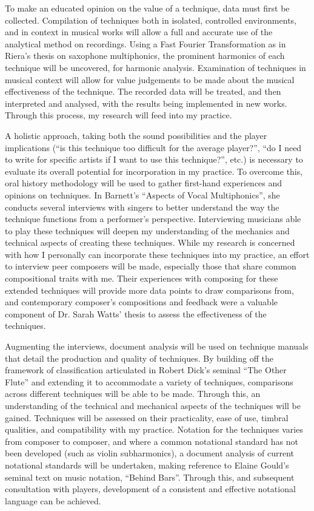 To make an educated opinion on the value of a technique, data must first be collected. Compilation of techniques both in isolated, controlled environments, and in context in musical works will allow a full and accurate use of the analytical method on recordings. Using a Fast Fourier Transformation as in Riera’s thesis on saxophone multiphonics, the prominent harmonics of each technique will be uncovered, for harmonic analysis.\autocite{rieraComparativeStudySaxophone2014} Examination of techniques in musical context will allow for value judgements to be made about the musical effectiveness of the technique. The recorded data will be treated, and then interpreted and analysed, with the results being implemented in new works.\autocite{torresMultiphonicsCompositionalElement2012} Through this process, my research will feed into my practice.

A holistic approach, taking both the sound possibilities and the player implications (“is this technique too difficult for the average player?”, “do I need to write for specific artists if I want to use this technique?”, etc.) is necessary to evaluate its overall potential for incorporation in my practice. To overcome this, oral history methodology will be used to gather first-hand experiences and opinions on techniques. In Barnett’s “Aspects of Vocal Multiphonics”, she conducts several interviews with singers to better understand the way the technique functions from a performer’s perspective.\autocite{barnettAspectsVocalMultiphonics1977} Interviewing musicians able to play these techniques will deepen my understanding of the mechanics and technical aspects of creating these techniques. While my research is concerned with how I personally can incorporate these techniques into my practice, an effort to interview peer composers will be made, especially those that share common compositional traits with me. Their experiences with composing for these extended techniques will provide more data points to draw comparisons from, and contemporary composer’s compositions and feedback were a valuable component of Dr. Sarah Watts’ thesis to assess the effectiveness of the techniques.

Augmenting the interviews, document analysis will be used on technique manuals that detail the production and quality of techniques. By building off the framework of classification articulated in Robert Dick’s seminal “The Other Flute” and extending it to accommodate a variety of techniques, comparisons across different techniques will be able to be made.\autocite{dickOtherFlute1989}  Through this, an understanding of the technical and mechanical aspects of the techniques will be gained. Techniques will be assessed on their practicality, ease of use, timbral qualities, and compatibility with my practice. Notation for the techniques varies from composer to composer, and where a common notational standard has not been developed (such as violin subharmonics), a document analysis of current notational standards will be undertaken, making reference to Elaine Gould’s seminal text on music notation, “Behind Bars”.\autocite{gouldBars2011} Through this, and subsequent consultation with players, development of a consistent and effective notational language can be achieved.

